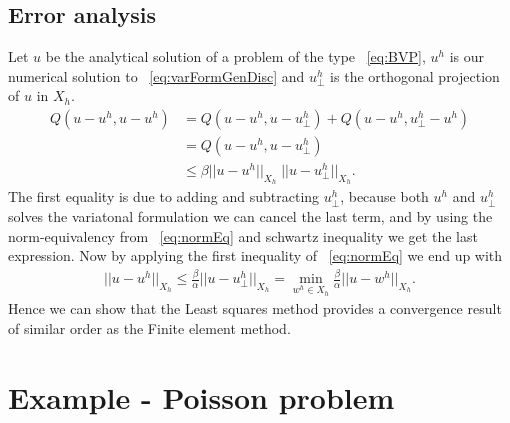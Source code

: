\subsection{Error analysis}
Let $u$ be the analytical solution of a problem of the type ~\ref{eq:BVP}, $u^h$ is our numerical solution to ~\ref{eq:varFormGenDisc} and $u^h_{\perp} $ is the orthogonal projection of $u$ in $X_h$. 
\begin{align}
	Q(u-u^h,u-u^h) &= Q(u-u^h,u-u^h_{\perp}) + Q(u-u^h,u^h_{\perp}-u^h) \\
							   &= Q(u-u^h,u-u^h_{\perp}) \\
							 	 &\leq \beta ||u-u^h||_{X_h} \; ||u-u^h_{\perp}||_{X_h}.
	\label{eq:error1}
\end{align}
The first equality is due to adding and subtracting $u^h_{\perp}$, because both $u^h$ and $u^h_{\perp}$ solves the variatonal formulation we can cancel the last term, and by using the norm-equivalency from ~\ref{eq:normEq} and schwartz inequality we get the last  expression. Now by applying the first inequality of ~\ref{eq:normEq} we end up with 
\begin{align}
	||u-u^h||_{X_h}\leq \frac{\beta}{\alpha}||u-u^h_{\perp}||_{X_h} = \min_{w^h \in X_h}\frac{\beta}{\alpha}||u-w^h||_{X_h}.
	\label{error_final}
\end{align}
Hence we can show that the Least squares method provides a convergence result of similar order as the Finite element method.


\section{Example - Poisson problem}

